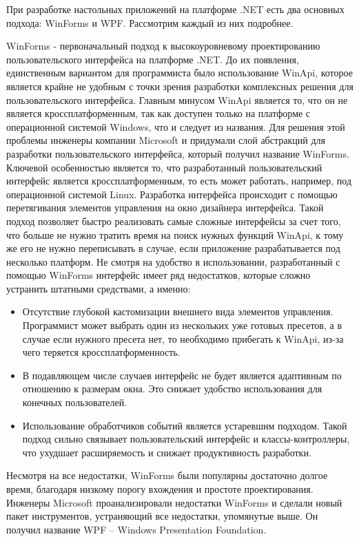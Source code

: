 При разработке настольных приложений на платформе .NET есть два основных подхода: WinForms и WPF. Рассмотрим каждый из них подробнее.

WinForms - первоначальный подход к высокоуровневому проектированию пользовательского интерфейса на платформе .NET. До их появления, единственным вариантом для программиста было использование WinApi, которое
является крайне не удобным с точки зрения разработки комплексных решения для пользовательского интерфейса. Главным минусом WinApi является то, что он не является кроссплатформенным, так как доступен
только на платформе с операционной системой Windows, что и следует из названия. Для решения этой проблемы инженеры компании Microsoft и придумали слой абстракций для разработки пользовательского
интерфейса, который получил название WinForms. Ключевой особенностью является то, что разработанный пользовательский интерфейс является кроссплатформенным, то есть может работать, например, под
операционной системой Linux. Разработка интерфейса происходит с помощью перетягивания элементов управления на окно дизайнера интерфейса. Такой подход позволяет быстро реализовать самые сложные интерфейсы
за счет того, что больше не нужно тратить время на поиск нужных функций WinApi, к тому же его не нужно переписывать в случае, если приложение разрабатывается под несколько платформ. Не смотря
на удобство в использовании, разработанный с помощью WinForms интерфейс имеет ряд недостатков, которые сложно устранить штатными средствами, а именно: 

\begin{itemize}
	\item Отсутствие глубокой кастомизации внешнего вида элементов управления. Программист может выбрать один из нескольких уже готовых пресетов, а в случае если нужного пресета нет, то необходимо прибегать к WinApi, из-за чего теряется кроссплатформенность.
	\item В подавляющем числе случаев интерфейс не будет является адаптивным по отношению к размерам окна. Это снижает удобство использования для конечных пользователей.
	\item Использование обработчиков событий является устаревшим подходом. Такой подход сильно связывает пользовательский интерфейс и классы-контроллеры, что ухудшает расширяемость и снижает продуктивность разработки.
\end{itemize}

Несмотря на все недостатки, WinForms были популярны достаточно долгое время, благодаря низкому порогу вхождения и простоте проектирования. Инженеры Microsoft проанализировали недостатки WinForms и
сделали новый пакет инструментов, устраняющий все недостатки, упомянутые выше. Он получил название WPF -- Windows Presentation Foundation.

